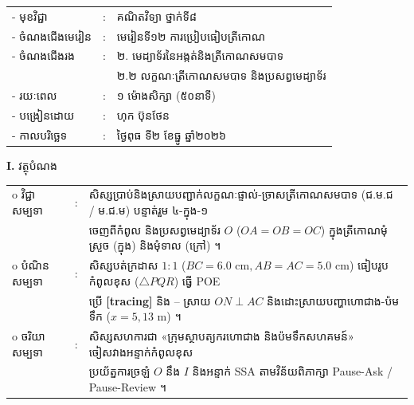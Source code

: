 \documentclass[a4paper,10pt]{article}
\newcommand{\wcirc}{{\CourierBullet\fontsize{9.5pt}{11pt}\selectfont o}}
\newcommand{\en}[1]{{\TimesEn #1}}
\newcommand{\cnum}[1]{{\fontsize{10.5pt}{12pt}\selectfont\ding{\numexpr181+#1\relax}}\hspace{0.2em}}
\newcommand{\tri}[1]{\ensuremath{\triangle #1}}
\begin{document}
{\renewcommand{\arraystretch}{1.04}
\hspace*{4.05cm}%
\begin{tabular}{@{}l l l@{}}
  - \hspace{0.35cm} មុខវិជ្ជា & : & គណិតវិទ្យា ថ្នាក់ទី៨ \\
  - \hspace{0.35cm} ចំណងជើងមេរៀន & : & មេរៀនទី១២ ការប្រៀបធៀបត្រីកោណ \\
  - \hspace{0.35cm} ចំណងជើងរង & : & ២. មេដ្យាទ័រនៃអង្កត់និងត្រីកោណសមបាទ \\
  & & ២.២ លក្ខណៈត្រីកោណសមបាទ និងប្រសព្វមេដ្យាទ័រ \\
  - \hspace{0.35cm} រយៈពេល & : & ១ ម៉ោងសិក្សា (៥០នាទី) \\
  - \hspace{0.35cm} បង្រៀនដោយ & : & ហុក ប៊ុនថែន \\
  - \hspace{0.35cm} កាលបរិច្ឆេទ & : & ថ្ងៃពុធ ទី២ ខែធ្នូ ឆ្នាំ២០២៦ \\
\end{tabular}

\vspace{2pt}

\textbf{I.} {\muol វត្ថុបំណង}\\[2pt]
\hspace*{0.55cm}%
\begin{tabular}{@{}l l l@{}}
  \wcirc \hspace{0.25cm} វិជ្ជាសម្បទា & : & សិស្សប្រាប់និងស្រាយបញ្ជាក់លក្ខណៈផ្ទាល់-ច្រាសត្រីកោណសមបាទ (ជ.ម.ជ / ម.ជ.ម) បន្ទាត់រួម ៤-ក្នុង-១ \\
  & & ចេញពីកំពូល និងប្រសព្វមេដ្យាទ័រ $O$ ($OA=OB=OC$) ក្នុងត្រីកោណមុំស្រួច (ក្នុង) និងមុំទាល (ក្រៅ) ។ \\
  \wcirc \hspace{0.25cm} បំណិនសម្បទា & : & សិស្សបត់ក្រដាស $1:1$ ($BC=6.0\text{ cm}, AB=AC=5.0\text{ cm}$) ធៀបរូបកំពូលខុស ($\tri{PQR}$) ធ្វើ POE \\
  & & ប្រើ \textbf{[tracing]} និង \cnum{1}--\cnum{5} ស្រាយ $ON\perp AC$ និងដោះស្រាយបញ្ហាហោជាង-ប៉មទឹក ($x=5, 13\text{ m}$) ។ \\
  \wcirc \hspace{0.25cm} ចរិយាសម្បទា & : & សិស្សសហការជា «ក្រុមស្ថាបត្យករហោជាង និងប៉មទឹកសហគមន៍» ចៀសវាងអន្ទាក់កំពូលខុស \\
  & & ប្រយ័ត្នការច្រឡំ $O$ នឹង $I$ និងអន្ទាក់ \en{SSA} តាមវិន័យពិភាក្សា \en{Pause-Ask / Pause-Review} ។ \\
\end{tabular}

}
\end{document}
